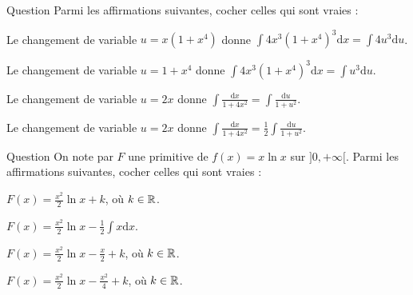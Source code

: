 \begin{multi}[multiple,feedback=
{Avec \(u=1+x^4\), on a : \(\mathrm{d}u=4x^3\mathrm{d}x\). D'où \(\displaystyle \int 4x^3(1+x^4)^3\mathrm{d}x=\int u^3\mathrm{d}u\). De même, avec \(u=2x\), on a : \(\mathrm{d}u=2\mathrm{d}x\). D'où \(\displaystyle \int \frac{\mathrm{d}x}{1+4x^2}=\frac{1}{2}\int \frac{\mathrm{d}u}{1+u^2}\).
}]{Question}
Parmi les affirmations suivantes, cocher celles qui sont vraies :

    \item Le changement de variable \(\displaystyle u=x(1+x^4)\) donne \(\displaystyle \int 4x^3(1+x^4)^3\mathrm{d}x=\int 4u^3\mathrm{d}u\).
    \item* Le changement de variable \(\displaystyle u=1+x^4\) donne \(\displaystyle \int 4x^3(1+x^4)^3\mathrm{d}x=\int u^3\mathrm{d}u\).
    \item Le changement de variable \(\displaystyle u=2x\) donne \(\displaystyle \int \frac{\mathrm{d}x}{1+4x^2}=\int \frac{\mathrm{d}u}{1+u^2}\).
    \item* Le changement de variable \(\displaystyle u=2x\) donne \(\displaystyle \int \frac{\mathrm{d}x}{1+4x^2}=\frac{1}{2}\int \frac{\mathrm{d}u}{1+u^2}\).
\end{multi}


\begin{multi}[multiple,feedback=
{Une intégration par parties, avec \(u=\ln x\) et \(v=x^2/2\), donne
\[F(x)=\frac{x^2}{2}\ln x-\frac{1}{2}\int x\mathrm{d}x=\frac{x^2}{2}\ln x-\frac{x^2}{4}+k,\; k\in \Rr.\]
}]{Question}
On note par \(F\) une primitive de \(f(x)=x\ln x\) sur \(]0,+\infty[\). Parmi les affirmations suivantes, cocher celles qui sont vraies :

    \item \(\displaystyle F(x)=\frac{x^2}{2}\ln x+k\), où \(k\in \mathbb{R}\).
    \item* \(\displaystyle F(x)=\frac{x^2}{2}\ln x-\frac{1}{2}\int x\mathrm{d}x\).
    \item \(\displaystyle F(x)=\frac{x^2}{2}\ln x-\frac{x}{2}+k\), où \(k\in \mathbb{R}\).
    \item* \(\displaystyle F(x)=\frac{x^2}{2}\ln x-\frac{x^2}{4}+k\), où \(k\in \mathbb{R}\).
\end{multi}



